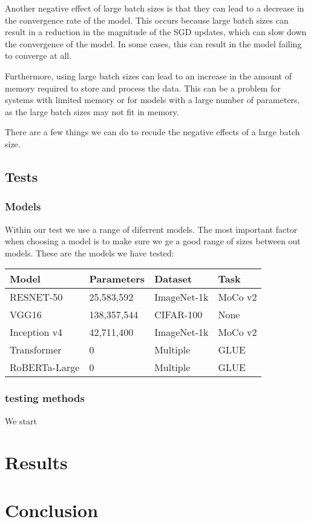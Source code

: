 \documentclass[11pt]{article}
\begin{document}
Another negative effect of large batch sizes is that they can lead to a decrease in the convergence rate of the model. This occurs because large batch sizes can result in a reduction in the magnitude of the SGD updates, which can slow down the convergence of the model. In some cases, this can result in the model failing to converge at all.

Furthermore, using large batch sizes can lead to an increase in the amount of memory required to store and process the data. This can be a problem for systems with limited memory or for models with a large number of parameters, as the large batch sizes may not fit in memory.

There are a few things we can do to recude the negative effects of a large batch size.

\subsection{Tests}
\subsubsection{Models}
Within our test we use a range of diferrent models. The most important factor when choosing a model is to make sure we ge a good range of sizes between out models. These are the models we have tested:

\begin{center}
\begin{tabular}{| p{3cm} | p{3cm} | p{3cm} | p{3cm} |} 
\hline
Model & Parameters & Dataset & Task \\ \hline
RESNET-50 & 25,583,592 & ImageNet-1k & MoCo v2 \\ \hline
VGG16 &  138,357,544 & CIFAR-100 & None \\ \hline
Inception v4 & 42,711,400 & ImageNet-1k & MoCo v2\\ \hline
Transformer & 0 & Multiple & GLUE \\ \hline
RoBERTa-Large & 0 & Multiple & GLUE \\ \hline
\end{tabular}
\end{center}
\subsubsection{testing methods}
We start 

\section{Results}
\section{Conclusion}
 
\end{document}
